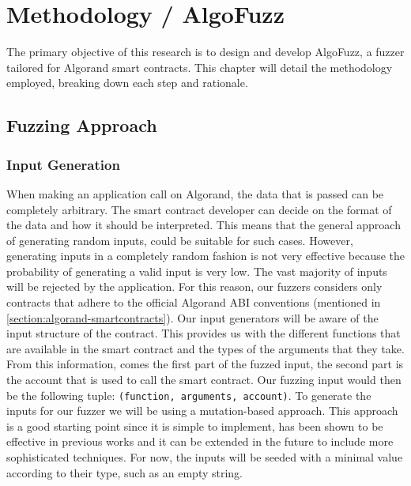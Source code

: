 
\chapter{Methodology / AlgoFuzz}\label{chapter:methodology}
The primary objective of this research is to design and develop AlgoFuzz, a fuzzer tailored for Algorand smart contracts.
This chapter will detail the methodology employed, breaking down each step and rationale.

\section{Fuzzing Approach}

\subsection*{Input Generation}
When making an application call on Algorand, the data that is passed can be completely arbitrary.
The smart contract developer can decide on the format of the data and how it should be interpreted.
This means that the general approach of generating random inputs, could be suitable for such cases.
However, generating inputs in a completely random fashion is not very effective because the probability of generating a valid input is very low.
The vast majority of inputs will be rejected by the application.
For this reason, our fuzzers considers only contracts that adhere to the official Algorand \ac{ABI} conventions (mentioned in \ref{section:algorand-smartcontracts}).
Our input generators will be aware of the input structure of the contract.
This provides us with the different functions that are available in the smart contract and the types of the arguments that they take.
From this information, comes the first part of the fuzzed input, the second part is the account that is used to call the smart contract.
Our fuzzing input would then be the following tuple: \texttt{(function, arguments, account)}.
To generate the inputs for our fuzzer we will be using a mutation-based approach.
This approach is a good starting point since it is simple to implement, has been shown to be effective in previous works \cite{zeller_greybox_2023} and it can be extended in the future to include more sophisticated techniques.
For now, the inputs will be seeded with a minimal value according to their type, such as an empty string.

